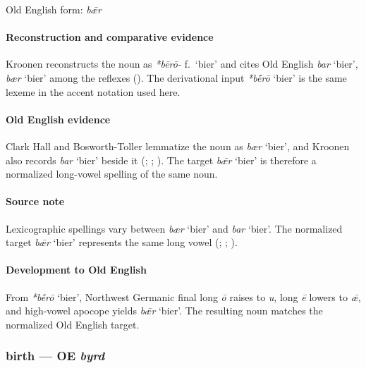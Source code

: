 \documentclass[
  british,
  a4paper,
]{article}
\providecommand{\Recon}[1]{\emph{*#1}}
\begin{document}
Old English form: \emph{bǣr}

\paragraph{Reconstruction and comparative
evidence}\label{reconstruction-and-comparative-evidence-4}

Kroonen reconstructs the noun as {\emph{*bērō-}} f.~`bier' and cites Old
English {\emph{bar}} `bier', {\emph{bær}} `bier' among the reflexes
(). The derivational input
\Recon{bḗrō} `bier' is the same lexeme in the accent notation used here.

\paragraph{Old English evidence}\label{old-english-evidence-4}

Clark Hall and Bosworth-Toller lemmatize the noun as {\emph{bær}}
`bier', and Kroonen also records {\emph{bar}} `bier' beside it
(;
;
). The target {\emph{bǣr}}
`bier' is therefore a normalized long-vowel spelling of the same noun.

\paragraph{Source note}\label{source-note}

Lexicographic spellings vary between {\emph{bær}} `bier' and
{\emph{bar}} `bier'. The normalized target {\emph{bǣr}} `bier'
represents the same long vowel (; ;
).

\paragraph{Development to Old
English}\label{development-to-old-english-4}

From \Recon{bḗrō} `bier', Northwest Germanic final long \emph{ō} raises
to \emph{u}, long \emph{ē} lowers to \emph{ǣ}, and high-vowel apocope
yields {\emph{bǣr}} `bier'. The resulting noun matches the normalized
Old English target.

\subsubsection{\texorpdfstring{birth --- OE
\emph{byrd}}{birth --- OE byrd}}\label{birth-oe-byrd}
\end{document}
